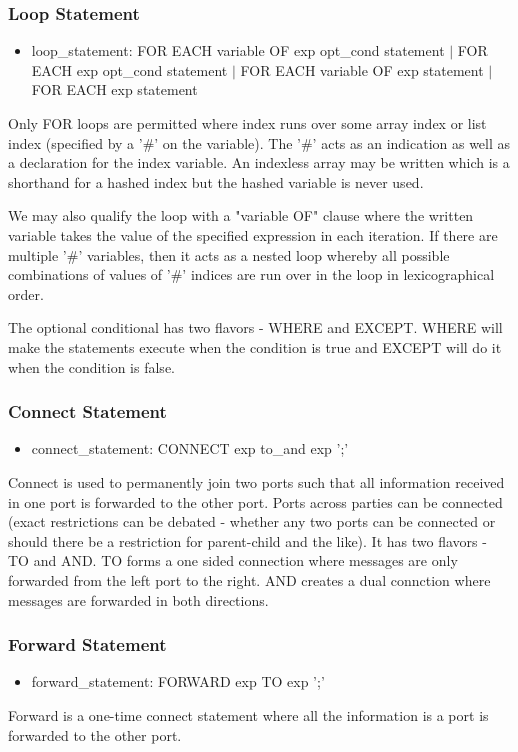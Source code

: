 \subsubsection{Loop Statement}
\begin{itemize}
\item loop\_statement: FOR EACH variable OF exp opt\_cond statement $|$ FOR EACH exp opt\_cond statement
$|$ FOR EACH variable OF exp statement $|$ FOR EACH exp statement
\end{itemize}

Only FOR loops are permitted where index runs over some array index or list index (specified by a '\#' on the variable). The '\#' acts as an indication as well as a declaration for the index variable. An indexless array may be written which is a shorthand for a hashed index but the hashed variable is never used.

We may also qualify the loop with a "variable OF" clause where the written variable takes the value of the specified expression in each iteration. If there are multiple '\#' variables, then it acts as a nested loop whereby all possible combinations of values of '\#' indices are run over in the loop in lexicographical order.

The optional conditional has two flavors - WHERE and EXCEPT. WHERE will make the statements execute when the condition is true and EXCEPT will do it when the condition is false.

\subsubsection{Connect Statement}
\begin{itemize}
\item connect\_statement: CONNECT exp to\_and exp ';'
\end{itemize}

Connect is used to permanently join two ports such that all information received
in one port is forwarded to the other port. Ports across parties can be connected
(exact restrictions can be debated - whether any two ports can be connected or should
 there be a restriction for parent-child and the like). It has two flavors - TO and AND.
 TO forms a one sided connection where messages are only forwarded from the left port to
 the right. AND creates a dual connction where messages are forwarded in both directions.


\subsubsection{Forward Statement}
\begin{itemize}
\item forward\_statement: FORWARD exp TO exp ';'
\end{itemize}

Forward is a one-time connect statement where all the information is a port is forwarded to the other port.
